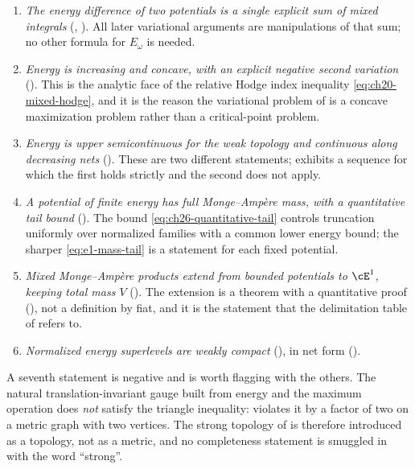 \begin{enumerate}
\item\label{itm:ch26-payoff:cocycle}
 \emph{The energy difference of two potentials is a single explicit sum of
 mixed integrals} (,
 ).  All later variational arguments
 are manipulations of that sum; no other formula for $E_\omega$ is needed.
\item\label{itm:ch26-payoff:concave}
 \emph{Energy is increasing and concave, with an explicit negative second
 variation} ().  This is the analytic face
 of the relative Hodge index inequality
 \eqref{eq:ch20-mixed-hodge}, and it is the reason the variational problem of
  is a concave maximization problem
 rather than a critical-point problem.
\item\label{itm:ch26-payoff:usc}
 \emph{Energy is upper semicontinuous for the weak topology and continuous
 along decreasing nets} ().  These are two
 different statements;  exhibits a sequence for
 which the first holds strictly and the second does not apply.
\item\label{itm:ch26-payoff:full-mass}
 \emph{A potential of finite energy has full Monge--Amp\`ere mass, with a
 quantitative tail bound} ().  The bound
 \eqref{eq:ch26-quantitative-tail} controls truncation uniformly over
 normalized families with a common lower energy bound; the sharper
 \eqref{eq:e1-mass-tail} is a statement for each fixed potential.
\item\label{itm:ch26-payoff:mixed}
 \emph{Mixed Monge--Amp\`ere products extend from bounded potentials to
 $\cE^1$, keeping total mass $V$}
 ().  The extension is a theorem with a
 quantitative proof (), not a definition by fiat,
 and it is the statement that the delimitation table of
  refers to.
\item\label{itm:ch26-payoff:compact}
 \emph{Normalized energy superlevels are weakly compact}
 (), in net form
 ().
\end{enumerate}

A seventh statement is negative and is worth flagging with the others.  The
natural translation-invariant gauge built from energy and the maximum
operation does \emph{not} satisfy the triangle inequality:
 violates it by a factor of two on a metric
graph with two vertices.  The strong topology of
 is therefore introduced as a topology, not as a
metric, and no completeness statement is smuggled in with the word
``strong''.

